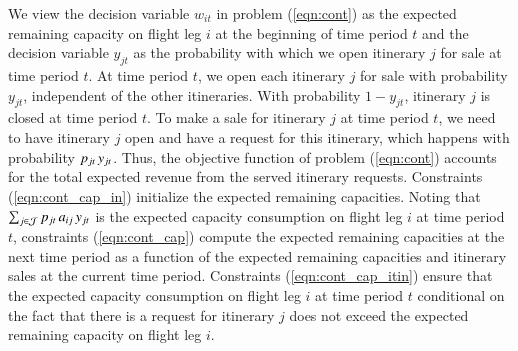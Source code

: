 We view the decision variable $w_{it}$ in problem (\ref{eqn:cont}) as the expected remaining capacity on flight leg $i$ at the beginning of time period $t$ and the decision variable $y_{jt}$ as the probability with which we open itinerary $j$ for sale at time period $t$. At time period $t$, we open each itinerary $j$ for sale with probability $y_{jt}$, independent of the other itineraries. With probability $1 - y_{jt}$, itinerary $j$ is closed at time period $t$. To make a sale for itinerary $j$ at time period $t$, we need to have itinerary $j$ open and have a request for this itinerary, which happens with probability $p_{jt} {\,} y_{jt}$. Thus, the objective function of problem (\ref{eqn:cont}) accounts for the total expected revenue from the served itinerary requests. Constraints (\ref{eqn:cont_cap_in}) initialize the expected remaining capacities. Noting that $\sum_{j \in {\cal J}} p_{jt} {\,} a_{ij} {\,} y_{jt}$ is the expected capacity consumption on flight leg $i$ at time period $t$, constraints (\ref{eqn:cont_cap}) compute the expected remaining capacities at the next time period as a function of the expected remaining capacities and itinerary sales at the current time period. Constraints (\ref{eqn:cont_cap_itin}) ensure that the expected capacity consumption on flight leg $i$ at time period $t$ conditional on the fact that there is a request for itinerary $j$ does not exceed the expected remaining capacity on flight leg $i$. 



